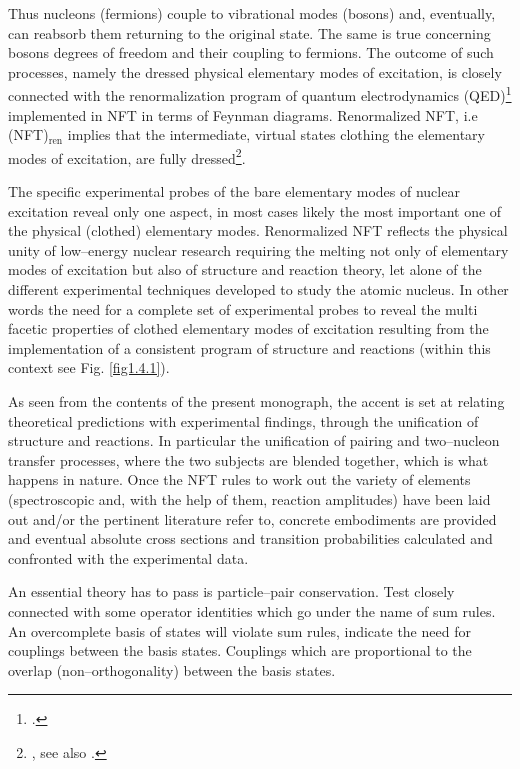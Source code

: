  
 Thus nucleons (fermions)  couple to  vibrational modes (bosons) and, eventually, can reabsorb them returning to the original state. The same is true concerning bosons degrees of freedom and their coupling to fermions.  The outcome of such processes, namely the dressed physical elementary modes of excitation, is closely connected with the renormalization program of quantum electrodynamics (QED)\footnote{\cite{Feynman:75,Schwinger:01}.} implemented in NFT in terms of Feynman diagrams. Renormalized NFT, i.e (NFT)$_{\text{ren}}$ implies that the intermediate, virtual states clothing the elementary modes of excitation, are fully dressed\footnote{\cite{Barranco:17}, see also \cite{Broglia:16}.}. 
  
 
  The specific experimental probes of the bare elementary modes of nuclear excitation reveal only one aspect, in most cases likely the most important one of the physical (clothed) elementary modes. Renormalized NFT  reflects the physical unity of  low--energy nuclear research requiring the melting not only of elementary modes of excitation but also of structure and reaction theory, let alone of the different experimental techniques developed to study the atomic nucleus. In other words the need for a complete set of experimental probes to reveal the multi facetic properties of clothed elementary modes of excitation resulting  from the implementation of  a consistent program of structure and reactions (within this context see  Fig. \ref{fig1.4.1}).


As  seen from the contents of the present monograph, the accent is set at relating theoretical predictions with experimental findings, through the unification of structure and reactions. In particular the unification of pairing and two--nucleon transfer processes, where the two subjects are blended together, which is what happens in nature.  Once the NFT rules to work out the variety of elements (spectroscopic and, with the help of them, reaction amplitudes) have been laid  out and/or the pertinent literature refer to, concrete embodiments are provided and eventual absolute cross sections and transition probabilities calculated and confronted with the experimental data. 

An essential theory has to pass is particle--pair conservation. Test closely connected with some operator identities which go under the name of sum rules. An overcomplete basis of states will violate sum rules, indicate the need for couplings between the basis states. Couplings which are proportional to the overlap (non--orthogonality) between the basis states.

